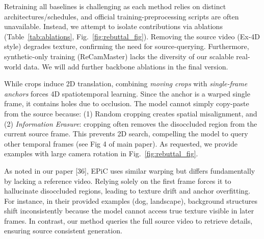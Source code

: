 \documentclass[10pt,twocolumn,letterpaper]{article}
\newcommand{\fv}[1]{{\color{Red}\textbf{#1}}}   %
\begin{document}
% 
\noindent \fv{R1Q1-Backbone}
Retraining all baselines is challenging as each method relies on distinct architectures/schedules, and official training-preprocessing scripts are often unavailable. Instead, we attempt to isolate contributions via ablations (Table~\ref{tab:ablations}, Fig.~\ref{fig:rebuttal_fig}). Removing the source video (Ex-4D style) degrades texture, confirming the need for source-querying. Furthermore, synthetic-only training (ReCamMaster) lacks the diversity of our scalable real-world data. We will add further backbone ablations in the final version.


\noindent \fv{R1Q2-Rotation}
While crops induce 2D translation, combining \textit{moving crops} with \textit{single-frame anchors} forces 4D spatiotemporal learning. Since the anchor is a warped single frame, it contains holes due to occlusion. The model cannot simply copy-paste from the source because: (1) Random cropping creates spatial misalignment, and (2) \textit{Information Erasure}: cropping often removes the disoccluded region from the current source frame. This prevents 2D search, compelling the model to query other temporal frames (see Fig 4 of main paper). As requested, we provide examples with large camera rotation in Fig.~\ref{fig:rebuttal_fig}.




\noindent \fv{R1Q3-EPiC}
As noted in our paper [36], EPiC uses similar warping but differs fundamentally by lacking a reference video. Relying solely on the first frame forces it to hallucinate disoccluded regions, leading to texture drift and anchor overfitting. For instance, in their provided examples (dog, landscape), background structures shift inconsistently because the model cannot access true texture visible in later frames. In contrast, our method queries the full source video to retrieve details, ensuring source consistent generation.
\end{document}
